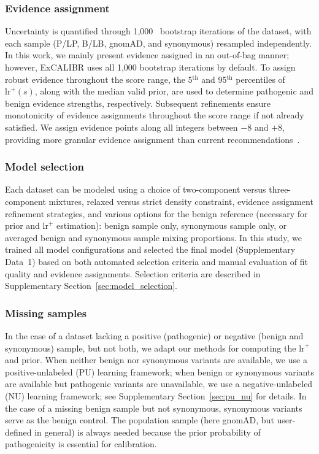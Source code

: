 \documentclass[11pt]{article}
\theoremstyle{plain}
\newcommand{\NumBootstraps}{1,000 }
\newcommand{\excalibr}{ExCALIBR\xspace}
\begin{document}
\subsubsection*{Evidence assignment}
Uncertainty is quantified through \NumBootstraps\ bootstrap %
iterations of the dataset, with each sample (P/LP, B/LB, gnomAD, and synonymous) resampled independently. In this work, we mainly present evidence assigned in an out-of-bag manner; however, \excalibr uses all \NumBootstraps bootstrap iterations by default. To assign robust evidence throughout the score range, the 5$^{\text{th}}$ and 95$^{\text{th}}$ percentiles of $\text{lr}^+(s)$, along with the median valid prior, are used to determine pathogenic and benign evidence strengths, respectively. Subsequent refinements ensure monotonicity of evidence assignments throughout the score range if not already satisfied. We assign evidence points along all integers between $-8$ and $+8$, providing more granular evidence assignment than current recommendations~\cite{brnich2020recommendations}.%

\subsubsection*{Model selection}
Each dataset can be modeled using a choice of two-component versus three-component mixtures, relaxed versus strict density constraint, evidence assignment refinement strategies, and various options for the benign reference (necessary for prior and $\text{lr}^+$ estimation): benign sample only, synonymous sample only, or averaged benign and synonymous sample mixing proportions. In this study, we trained all model configurations and selected the final model (Supplementary Data~1) based on both automated selection criteria and manual evaluation of fit quality and evidence assignments. Selection criteria are described in Supplementary Section~\ref*{sec:model_selection}.


\subsubsection*{Missing samples}
In the case of a dataset lacking a positive (pathogenic) or negative (benign and synonymous) sample, but not both, we %
adapt our methods for computing the $\text{lr}^+$ and prior. When neither benign nor synonymous variants are available, we use a positive-unlabeled (PU) learning framework; when benign or synonymous variants are available but pathogenic variants are unavailable, we use a negative-unlabeled (NU) learning framework; see Supplementary Section~\ref*{sec:pu_nu} for details. In the case of a missing benign sample but not synonymous, synonymous variants serve as the benign control. The population sample (here gnomAD, but user-defined in general) is always needed because the prior probability of pathogenicity is essential for calibration.
\end{document}
